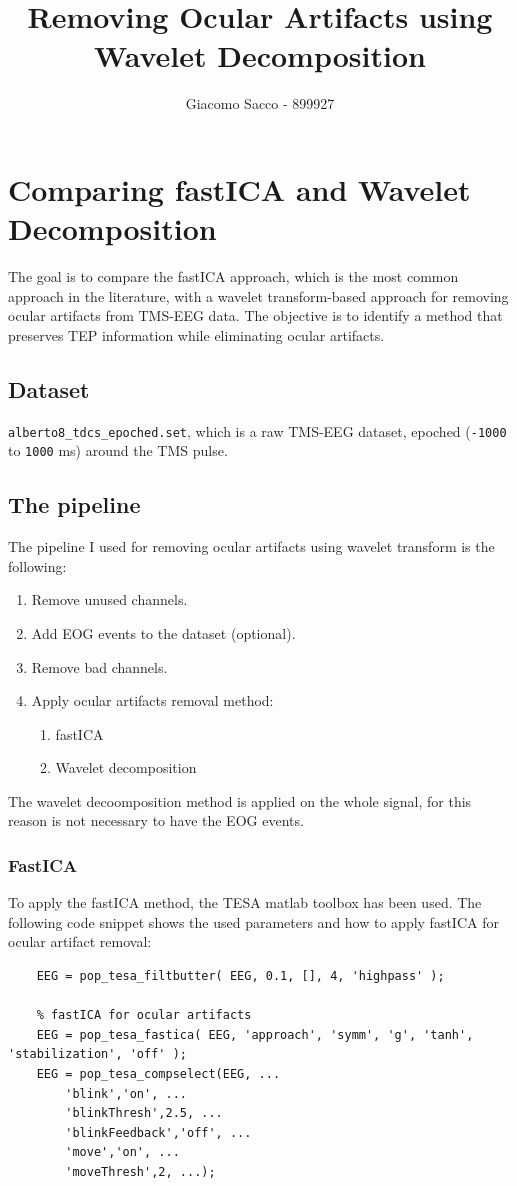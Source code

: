 \documentclass{article}
\title{Removing Ocular Artifacts using Wavelet Decomposition}
\author{Giacomo Sacco - 899927}
\begin{document}
\maketitle

\section{Comparing fastICA and Wavelet Decomposition}
The goal is to compare the fastICA approach, which is the most common approach in the literature, with a wavelet
transform-based approach for removing ocular artifacts from TMS-EEG data.
The objective is to identify a method that preserves TEP information while eliminating ocular artifacts.

\subsection{Dataset}
\texttt{alberto8\_tdcs\_epoched.set}, which is a raw TMS-EEG dataset, epoched (\texttt{-1000} to \texttt{1000} ms) around the TMS pulse.

\subsection{The pipeline}
The pipeline I used for removing ocular artifacts using wavelet transform is the following:
\begin{enumerate}
    \item Remove unused channels.
    \item Add EOG events to the dataset (optional).
    \item Remove bad channels.
    \item Apply ocular artifacts removal method:
        \begin{enumerate}
            \item fastICA
            \item Wavelet decomposition
        \end{enumerate}
\end{enumerate}
The wavelet decoomposition method is applied on the whole signal, for this reason is not necessary to have the EOG events.

\subsubsection{FastICA}
To apply the fastICA method, the TESA matlab toolbox has been used. 
The following code snippet shows the used parameters and how to apply fastICA for ocular artifact removal:
\begin{lstlisting}[style=Matlab-editor]
    % Highpass filter before ICA (0.1 Hz)
    EEG = pop_tesa_filtbutter( EEG, 0.1, [], 4, 'highpass' ); 

    % fastICA for ocular artifacts
    EEG = pop_tesa_fastica( EEG, 'approach', 'symm', 'g', 'tanh', 'stabilization', 'off' );
    EEG = pop_tesa_compselect(EEG, ...
        'blink','on', ...
        'blinkThresh',2.5, ...
        'blinkFeedback','off', ... 
        'move','on', ...
        'moveThresh',2, ...);
\end{lstlisting}
   
\end{document}
